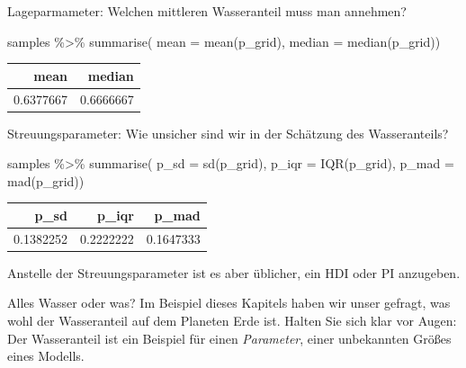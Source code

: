 \documentclass[
  a4paper,
  DIV=11]{scrreprt}
\newenvironment{Shaded}{\begin{snugshade}}{\end{snugshade}}
\newcommand{\AttributeTok}[1]{\textcolor[rgb]{0.40,0.45,0.13}{#1}}
\newcommand{\FunctionTok}[1]{\textcolor[rgb]{0.28,0.35,0.67}{#1}}
\newcommand{\NormalTok}[1]{\textcolor[rgb]{0.00,0.23,0.31}{#1}}
\newcommand{\SpecialCharTok}[1]{\textcolor[rgb]{0.37,0.37,0.37}{#1}}
\theoremstyle{definition}
\theoremstyle{remark}
\begin{document}
Lageparmameter: Welchen mittleren Wasseranteil muss man annehmen?

\begin{Shaded}
\begin{Highlighting}[]
\NormalTok{samples }\SpecialCharTok{\%\textgreater{}\%} 
  \FunctionTok{summarise}\NormalTok{(}
    \AttributeTok{mean   =} \FunctionTok{mean}\NormalTok{(p\_grid),}
    \AttributeTok{median =} \FunctionTok{median}\NormalTok{(p\_grid))  }
\end{Highlighting}
\end{Shaded}

\begin{longtable}[]{@{}rr@{}}
\toprule()
mean & median \\
\midrule()
\endhead
0.6377667 & 0.6666667 \\
\bottomrule()
\end{longtable}

Streuungsparameter: Wie unsicher sind wir in der Schätzung des
Wasseranteils?

\begin{Shaded}
\begin{Highlighting}[]
\NormalTok{samples }\SpecialCharTok{\%\textgreater{}\%} 
  \FunctionTok{summarise}\NormalTok{(}
    \AttributeTok{p\_sd   =} \FunctionTok{sd}\NormalTok{(p\_grid),}
    \AttributeTok{p\_iqr =} \FunctionTok{IQR}\NormalTok{(p\_grid),}
    \AttributeTok{p\_mad =} \FunctionTok{mad}\NormalTok{(p\_grid))  }
\end{Highlighting}
\end{Shaded}

\begin{longtable}[]{@{}rrr@{}}
\toprule()
p\_sd & p\_iqr & p\_mad \\
\midrule()
\endhead
0.1382252 & 0.2222222 & 0.1647333 \\
\bottomrule()
\end{longtable}

Anstelle der Streuungsparameter ist es aber üblicher, ein HDI oder PI
anzugeben.

\begin{tcolorbox}[enhanced jigsaw, title=\textcolor{quarto-callout-important-color}{\faExclamation}\hspace{0.5em}{Wichtig}, bottomtitle=1mm, bottomrule=.15mm, titlerule=0mm, colbacktitle=quarto-callout-important-color!10!white, colframe=quarto-callout-important-color-frame, leftrule=.75mm, left=2mm, toprule=.15mm, colback=white, arc=.35mm, breakable, toptitle=1mm, opacityback=0, rightrule=.15mm, coltitle=black, opacitybacktitle=0.6]

Alles Wasser oder was? Im Beispiel dieses Kapitels haben wir unser
gefragt, was wohl der Wasseranteil auf dem Planeten Erde ist. Halten Sie
sich klar vor Augen: Der Wasseranteil ist ein Beispiel für einen
\emph{Parameter}, einer unbekannten Größes eines Modells.

\end{tcolorbox}
\end{document}
